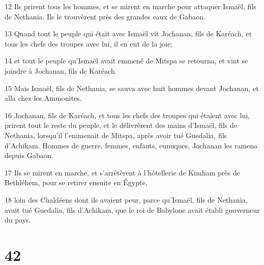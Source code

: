 \par 12 Ils prirent tous les hommes, et se mirent en marche pour attaquer Ismaël, fils de Nethania. Ils le trouvèrent près des grandes eaux de Gabaon.
\par 13 Quand tout le peuple qui était avec Ismaël vit Jochanan, fils de Karéach, et tous les chefs des troupes avec lui, il en eut de la joie;
\par 14 et tout le peuple qu'Ismaël avait emmené de Mitspa se retourna, et vint se joindre à Jochanan, fils de Karéach.
\par 15 Mais Ismaël, fils de Nethania, se sauva avec huit hommes devant Jochanan, et alla chez les Ammonites.
\par 16 Jochanan, fils de Karéach, et tous les chefs des troupes qui étaient avec lui, prirent tout le reste du peuple, et le délivrèrent des mains d'Ismaël, fils de Nethania, lorsqu'il l'emmenait de Mitspa, après avoir tué Guedalia, fils d'Achikam. Hommes de guerre, femmes, enfants, eunuques, Jochanan les ramena depuis Gabaon.
\par 17 Ils se mirent en marche, et s'arrêtèrent à l'hôtellerie de Kimham près de Bethléhem, pour se retirer ensuite en Égypte,
\par 18 loin des Chaldéens dont ils avaient peur, parce qu'Ismaël, fils de Nethania, avait tué Guedalia, fils d'Achikam, que le roi de Babylone avait établi gouverneur du pays.

\chapter{42}


